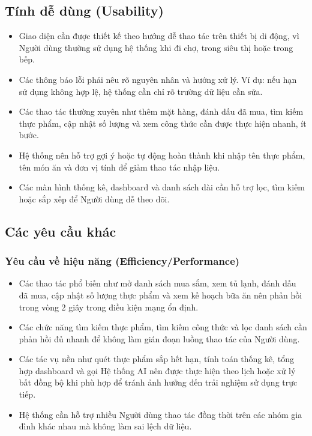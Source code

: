 \documentclass[../main.tex]{subfiles}
\begin{document}
\subsection{Tính dễ dùng (Usability)}
\begin{itemize}
    \item Giao diện cần được thiết kế theo hướng dễ thao tác trên thiết bị di động, vì Người dùng thường sử dụng hệ thống khi đi chợ, trong siêu thị hoặc trong bếp.
    \item Các thông báo lỗi phải nêu rõ nguyên nhân và hướng xử lý. Ví dụ: nếu hạn sử dụng không hợp lệ, hệ thống cần chỉ rõ trường dữ liệu cần sửa.
    \item Các thao tác thường xuyên như thêm mặt hàng, đánh dấu đã mua, tìm kiếm thực phẩm, cập nhật số lượng và xem công thức cần được thực hiện nhanh, ít bước.
    \item Hệ thống nên hỗ trợ gợi ý hoặc tự động hoàn thành khi nhập tên thực phẩm, tên món ăn và đơn vị tính để giảm thao tác nhập liệu.
    \item Các màn hình thống kê, dashboard và danh sách dài cần hỗ trợ lọc, tìm kiếm hoặc sắp xếp để Người dùng dễ theo dõi.
\end{itemize}

\subsection{Các yêu cầu khác}

\subsubsection{Yêu cầu về hiệu năng (Efficiency/Performance)}
\begin{itemize}
    \item Các thao tác phổ biến như mở danh sách mua sắm, xem tủ lạnh, đánh dấu đã mua, cập nhật số lượng thực phẩm và xem kế hoạch bữa ăn nên phản hồi trong vòng 2 giây trong điều kiện mạng ổn định.
    \item Các chức năng tìm kiếm thực phẩm, tìm kiếm công thức và lọc danh sách cần phản hồi đủ nhanh để không làm gián đoạn luồng thao tác của Người dùng.
    \item Các tác vụ nền như quét thực phẩm sắp hết hạn, tính toán thống kê, tổng hợp dashboard và gọi Hệ thống AI nên được thực hiện theo lịch hoặc xử lý bất đồng bộ khi phù hợp để tránh ảnh hưởng đến trải nghiệm sử dụng trực tiếp.
    \item Hệ thống cần hỗ trợ nhiều Người dùng thao tác đồng thời trên các nhóm gia đình khác nhau mà không làm sai lệch dữ liệu.
\end{itemize}
\end{document}
